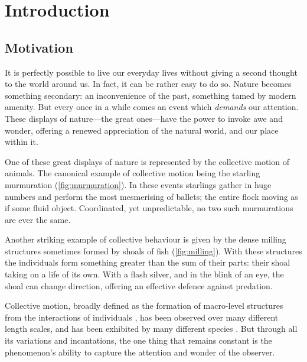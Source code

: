 \graphicspath{{fig/introduction/}}

\chapter{Introduction}
\label{cha:introduction}

\section{Motivation}
\label{sec:motivation}

It is perfectly possible to live our everyday lives without giving a second
thought to the world around us. In fact, it can be rather easy to do so. Nature
becomes something secondary: an inconvenience of the past, something tamed by
modern amenity. But every once in a while comes an event which \emph{demands}
our attention. These displays of nature---the great ones---have the power to
invoke awe and wonder, offering a renewed appreciation of the natural world,
and our place within it.

One of these great displays of nature is represented by the collective motion
of animals. The canonical example of collective motion being the starling
murmuration (\cref{fig:murmuration}). In these events starlings gather 
in huge numbers and perform the most mesmerising of ballets; the entire flock
moving as if some fluid object. Coordinated, yet unpredictable, no two such
murmurations are ever the same. 

Another striking example of collective behaviour is given by the dense milling
structures sometimes formed by shoals of fish (\cref{fig:milling}). With these
structures the individuals form something greater than the sum of their parts:
their shoal taking on a life of its own. With a flash silver, and in the blink
of an eye, the shoal can change direction, offering an effective defence
against predation.

Collective motion, broadly defined as the formation of macro-level structures
from the interactions of individuals \parencite{camazine03}, has been observed
over many different length scales, and has been exhibited by many different
species \parencite{allee31}. But through all its variations and incantations,
the one thing that remains constant is the phenomenon's ability to capture the
attention and wonder of the observer.

